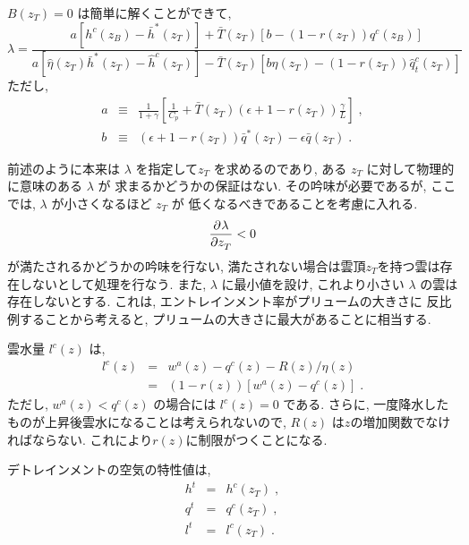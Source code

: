 $B(z_T) =0 $ は簡単に解くことができて,
\begin{equation}
  \lambda = \frac{ a\left[ h^c(z_B)-\bar{h}^*(z_T) \right]
                  +\bar{T}(z_T)\left[ b -(1-r(z_T))q^c(z_B) \right] }
                 { a\left[ \hat{\eta}(z_T) \bar{h}^*(z_T) 
                               - \hat{h}^c(z_T) \right]
                  -\bar{T}(z_T)\left[ b \hat{\eta}(z_T) 
                                     - (1-r(z_T))\hat{q}_t^c(z_T) \right] }
\end{equation}
ただし, 
\begin{eqnarray}
a & \equiv & \frac{1}{1+\gamma}
             \left[ \frac{1}{C_p} 
                + \bar{T}(z_T) 
                  \left( \epsilon+1-r(z_T) \right) 
               \frac{\gamma}{L}                \right] \; ,\\
b & \equiv & \left(\epsilon+1-r(z_T) \right) \bar{q}^*(z_T) 
                    - \epsilon \bar{q}(z_T) \; .
\end{eqnarray}

前述のように本来は $\lambda$ を指定して$z_T$ を求めるのであり,
ある $z_T$ に対して物理的に意味のある $\lambda$ が
求まるかどうかの保証はない. 
その吟味が必要であるが, ここでは,
$\lambda$ が小さくなるほど $z_T$ が
低くなるべきであることを考慮に入れる.
\begin{equation}
  \DP{\lambda}{z_T} < 0
\end{equation}
が満たされるかどうかの吟味を行ない,
満たされない場合は雲頂$z_T$を持つ雲は存在しないとして処理を行なう.
また, $\lambda$ に最小値を設け, 
これより小さい $\lambda$ の雲は存在しないとする.
これは, エントレインメント率がプリュームの大きさに
反比例することから考えると, 
プリュームの大きさに最大があることに相当する.

雲水量 $l^c(z)$ は,
\begin{eqnarray}
  l^c(z) & = & w^a(z)-q^c(z)-R(z)/\eta(z)  \nonumber \\
         & = & \left( 1-r(z) \right) \left[ w^a(z)-q^c(z) \right] \; .
\end{eqnarray}
ただし, $w^a(z) < q^c(z)$ の場合には $l^c(z)=0$ である.
さらに, 一度降水したものが上昇後雲水になることは考えられないので,
$R(z)$ は$z$の増加関数でなければならない.
これにより$r(z)$に制限がつくことになる.

デトレインメントの空気の特性値は,
\begin{eqnarray}
  h^t & = & h^c(z_T) \; , \\
  q^t & = & q^c(z_T) \; , \\
  l^t & = & l^c(z_T) \; .
\end{eqnarray}

